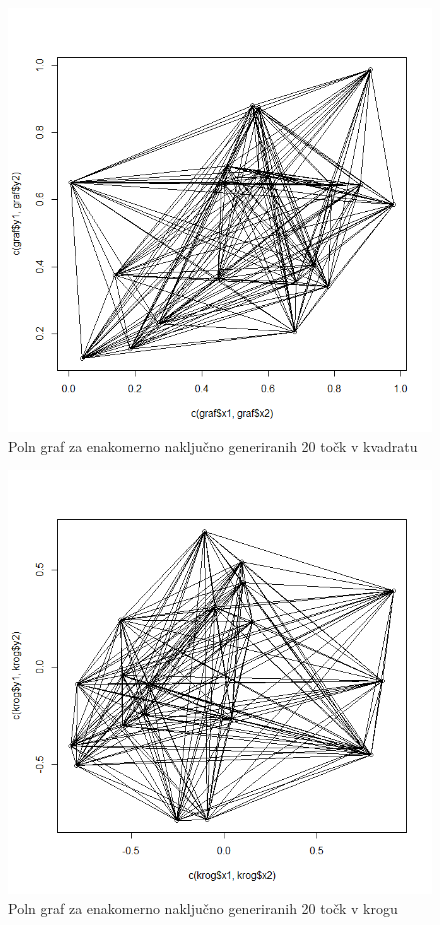 \documentclass[12pt, a4paper]{article}
\begin{document}
	\begin{figure}[h!]
		\caption{Poln graf za enakomerno naključno generiranih 20 točk v kvadratu}
		\includegraphics[scale=0.6]{graf_20}
		\centering
	\end{figure}
	\begin{figure}[h!]
		\caption{Poln graf za enakomerno naključno generiranih 20 točk v krogu}
		\includegraphics[scale=0.6]{krog_20}
		\centering
	\end{figure}
\end{document}
